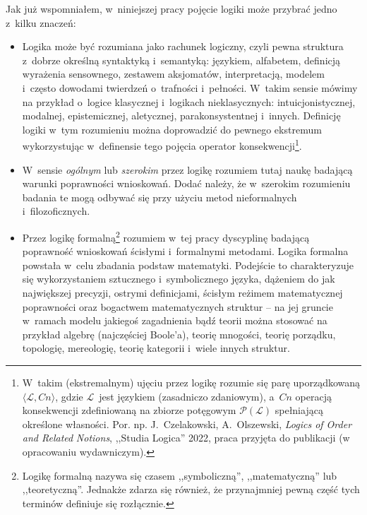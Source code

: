 Jak już wspomniałem, w~niniejszej pracy pojęcie logiki może przybrać jedno z~kilku znaczeń:
\begin{itemize}
\item Logika może być rozumiana jako rachunek logiczny, czyli pewna struktura z~dobrze określną syntaktyką i~semantyką: językiem, alfabetem, definicją wyrażenia sensownego, zestawem aksjomatów, interpretacją, modelem i~często dowodami twierdzeń o~trafności i~pełności. W~takim sensie mówimy na przykład o~logice klasycznej i~logikach nieklasycznych: intuicjonistycznej, modalnej, epistemicznej, aletycznej, parakonsystentnej i~innych. Definicję logiki w~tym rozumieniu można doprowadzić do pewnego ekstremum wykorzystując w~definensie tego pojęcia operator konsekwencji\footnote{W~takim (ekstremalnym) ujęciu przez logikę rozumie się parę uporządkowaną $\langle \mathcal{L}, Cn\rangle$, gdzie $\mathcal{L}$~jest językiem (zasadniczo zdaniowym), a~$Cn$ operacją konsekwencji zdefiniowaną na zbiorze potęgowym $\mathcal{P}(\mathcal{L})$ spełniającą określone własności. Por. np. J.~Czelakowski, A.~Olszewski, \textit{Logics of Order and Related} \textit{Notions}, ,,Studia Logica'' 2022, praca przyjęta do publikacji (w opracowaniu wydawniczym).}.
\item W~sensie \textit{ogólnym} lub \textit{szerokim} przez logikę rozumiem tutaj naukę badającą warunki poprawności wnioskowań. Dodać należy, że w~szerokim rozumieniu badania te mogą odbywać się przy użyciu metod nieformalnych i~filozoficznych.
\item Przez logikę formalną\footnote{Logikę formalną nazywa się czasem ,,symboliczną'', ,,matematyczną'' lub ,,teoretyczną''. Jednakże zdarza się również, że przynajmniej pewną część tych terminów definiuje się rozłącznie.} rozumiem w~tej pracy dyscyplinę badającą poprawność wnioskowań ścisłymi i~formalnymi metodami. Logika formalna powstała w~celu zbadania podstaw matematyki. Podejście to charakteryzuje się wykorzystaniem sztucznego i~symbolicznego języka, dążeniem do jak największej precyzji, ostrymi definicjami, ścisłym reżimem matematycznej poprawności oraz bogactwem matematycznych struktur -- na jej gruncie w~ramach modelu jakiegoś zagadnienia bądź teorii można stosować na przykład algebrę (najczęściej Boole'a), teorię mnogości, teorię porządku, topologię, mereologię, teorię kategorii i~wiele innych struktur.
\end{itemize}
